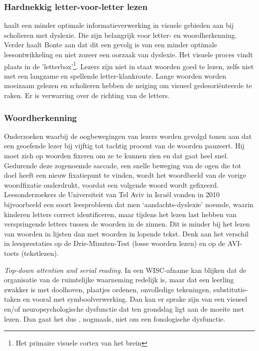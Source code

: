 \subsubsection{Hardnekkig letter-voor-letter lezen}


\textcite{Bonte2020} haalt een minder optimale informatieverwerking in visuele gebieden aan bij scholieren met dyslexie. Die zijn belangrijk voor letter- en woordherkenning. Verder haalt Bonte aan dat dit een gevolg is van een minder optimale leesontwikkeling en niet zozeer een oorzaak van dyslexie. Het visuele proces vindt plaats in de 'letterbox'\footnote{Het primaire visuele cortex van het brein}. Lezers zijn niet in staat woorden goed te lezen, zelfs niet met een langzame en spellende letter-klankroute. Lange woorden worden moeizaam gelezen en scholieren hebben de neiging om visueel gedesoriënteerde te raken. Er is verwarring over de richting van de letters.
	
\subsubsection{Woordherkenning}
Onderzoeken waarbij de oogbewegingen van lezers worden gevolgd tonen aan dat een geoefende lezer bij vijftig tot tachtig procent van de woorden pauzeert. Hij moet zich op woorden fixeren om ze te kunnen zien en dat gaat heel snel. Gedurende deze zogenoemde saccade, een snelle beweging van de ogen die tot doel heeft een nieuw fixatiepunt te vinden, wordt het woordbeeld van de vorige woordfixatie onderdrukt, voordat een volgende woord wordt gefixeerd. Leesonderzoekers de Universiteit van Tel Aviv in Israël vonden in 2010 bijvoorbeeld een soort leesprobleem dat men ‘aandachts-dyslexie’ noemde, waarin kinderen letters correct identificeren, maar tijdens het lezen last hebben van verspringende letters tussen de woorden in de zinnen. Dit is minder bij het lezen van woorden in lijsten dan met woorden in lopende tekst. Denk aan het verschil in leesprestaties op de Drie-Minuten-Test (losse woorden lezen) en op de AVI-toets (tekstlezen).

\textit{Top-down attention and serial reading}. In een WISC-afname kan blijken dat de organisatie van de ruimtelijke waarneming redelijk is, maar dat een leerling zwakker is met doolhoven, plaatjes ordenen, onvolledige tekeningen, substitutie-taken en vooral met symboolverwerking. Dan kan er sprake zijn van een visueel en/of neuropsychologische dysfunctie dat ten grondslag ligt aan de moeite met lezen. Dan gaat het dus , nogmaals, niet om een fonologische dysfunctie.
	
